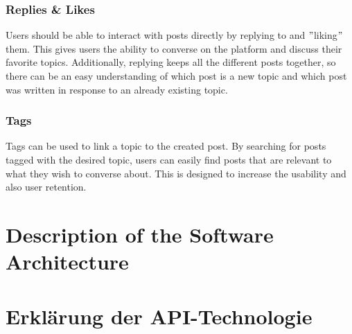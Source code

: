 \documentclass[a4paper, 11pt]{article}
\begin{document}
    \subsubsection{Replies \& Likes}
    Users should be able to interact with posts directly by replying to and \("\)liking\("\) them. This gives users the ability to converse on the platform and discuss their favorite topics. Additionally, replying keeps all the different posts together, so there can be an easy understanding of which post is a new topic and which post was written in response to an already existing topic.

    \subsubsection{Tags}
    Tags can be used to link a topic to the created post. By searching for posts tagged with the desired topic, users can easily find posts that are relevant to what they wish to converse about. This is designed to increase the usability and also user retention.




    \section{Description of the Software Architecture}\label{sec:description-of-the-software-architecture}



\section{Erklärung der API-Technologie} \label{sec:erklaerung-der-api-technologie}
\end{document}
